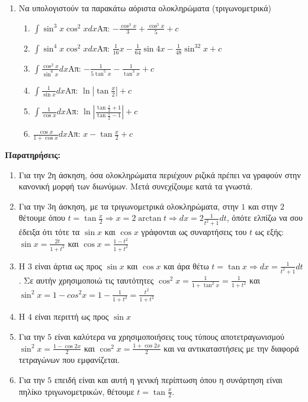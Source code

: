 \documentclass[a4paper,12pt]{article}
\begin{document}
\begin{enumerate}
\item Να υπολογιστούν τα παρακάτω αόριστα ολοκληρώματα (τριγωνομετρικά)
\begin{enumerate}
\item $\int\sin^3x\cos^2xdx$\hfill Απ: $-\frac{\cos^3x}{3}+\frac{\cos^5x}{5}+c$
\item $\int\sin^4x\cos^2xdx$\hfill Απ: $\frac{1}{16}x-\frac{1}{64}\sin 4x-\frac{1}{48}\sin^32x+c$
\item $\int\frac{\cos^2x}{\sin^6x}dx$\hfill Απ: $-\frac{1}{5\tan^5x}-\frac{1}{\tan^3x}+c$
\item $\int\frac{1}{\sin x}dx$\hfill Απ: $\ln|\tan\frac{x}{2}|+c$
\item $\int\frac{1}{\cos x}dx$\hfill Απ: $\ln|\frac{\tan\frac{x}{2}+1}{\tan\frac{x}{2}-1}|+c$
\item $\frac{\cos x}{1+\cos x}dx$\hfill Απ: $x-\tan\frac{x}{2}+c$
\end{enumerate}
\end{enumerate}

{\Large\bfseries Παρατηρήσεις:}
\begin{enumerate}
\item Για την $2$η άσκηση, όσα ολοκληρώματα περιέχουν ριζικά πρέπει να γραφούν στην κανονική μορφή των διωνύμων. Μετά συνεχίζουμε κατά τα γνωστά.

\item Για την $3$η άσκηση, με τα τριγωνομετρικά ολοκληρώματα, στην $1$ και στην $2$ θέτουμε όπου $t=\tan\frac{x}{2}\Rightarrow x=2\arctan t \Rightarrow dx=2\frac{1}{t^2+1}dt$, όπότε ελπίζω να σου έδειξα ότι τότε τα $\sin x$ και $\cos x$ γράφονται ως συναρτήσεις του $t$ ως εξής: $\sin x=\frac{2t}{1+t^2}$ και $\cos x =\frac{1-t^2}{1+t^2}$
\item Η $3$ είναι άρτια ως προς $\sin x$ και $\cos x$ και άρα θέτω $t=\tan x\Rightarrow dx=\frac{1}{t^2+1}dt$. Σε αυτήν χρησιμοποιώ τις ταυτότητες $\cos^2x=\frac{1}{1+\tan^2x}=\frac{1}{1+t^2}$ και $\sin^2x=1-cos^2x=1-\frac{1}{1+t^2}=\frac{t^2}{1+t^2}$
\item Η $4$ είναι περιττή ως προς $\sin x$
\item Για την $5$ είναι καλύτερα να χρησιμοποιήσεις τους τύπους αποτετραγωνισμού $\sin^2x=\frac{1-\cos 2x}{2}$ και $\cos^2x=\frac{1+\cos 2x}{2}$ και να αντικαταστήσεις με την διαφορά τετραγώνων που εμφανίζεται. 
\item Για την $5$ επειδή είναι και αυτή η γενική περίπτωση όπου η συνάρτηση είναι πηλίκο τριγωνομετρικών, θέτουμε $t=\tan\frac{x}{2}$. 
\end{enumerate}
\end{document}
